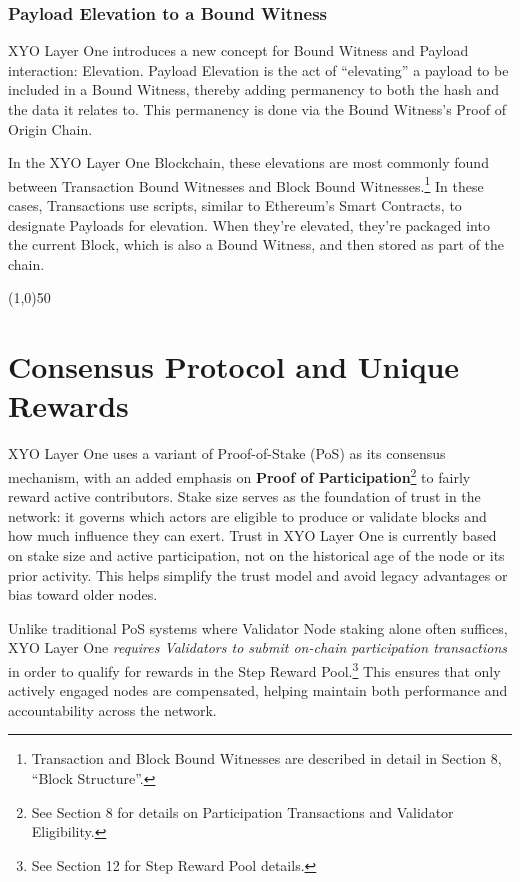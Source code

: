 \documentclass{article}
\begin{document}
\subsubsection{Payload Elevation to a Bound Witness}
XYO Layer One introduces a new concept for Bound Witness and Payload
interaction: Elevation. Payload Elevation is the act of “elevating” a payload
to be included in a Bound Witness, thereby adding permanency to both the hash
and the data it relates to. This permanency is done via the Bound Witness's
Proof of Origin Chain.

In the XYO Layer One Blockchain, these elevations are most commonly found
between Transaction Bound Witnesses and Block Bound
Witnesses.\footnote{Transaction and Block Bound Witnesses are described in
    detail in Section 8, “Block Structure”.} In these cases, Transactions use
scripts, similar to Ethereum's Smart Contracts, to designate Payloads for
elevation. When they're elevated, they're packaged into the current Block,
which is also a Bound Witness, and then stored as part of the chain.

\begin{center}
    \line(1,0){50}
\end{center}

\section{Consensus Protocol and Unique Rewards}
XYO Layer One uses a variant of Proof-of-Stake (PoS) as its consensus
mechanism, with an added emphasis on \textbf{Proof of
    Participation}\footnote{See Section 8 for details on Participation Transactions
    and Validator Eligibility.} to fairly reward active contributors. Stake size
serves as the foundation of trust in the network: it governs which actors are
eligible to produce or validate blocks and how much influence they can exert.
Trust in XYO Layer One is currently based on stake size and active
participation, not on the historical age of the node or its prior activity.
This helps simplify the trust model and avoid legacy advantages or bias toward
older nodes.

Unlike traditional PoS systems where Validator Node staking alone often
suffices, XYO Layer One \textit{requires Validators to submit on-chain
    participation transactions} in order to qualify for rewards in the Step Reward
Pool.\footnote{See Section 12 for Step Reward Pool details.} This ensures that
only actively engaged nodes are compensated, helping maintain both performance
and accountability across the network.
\end{document}
